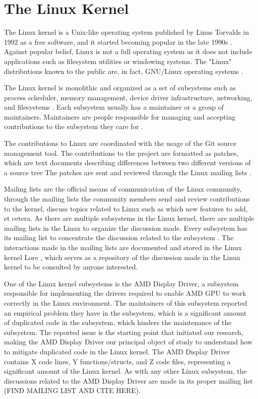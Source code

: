 \en

\section{The Linux Kernel}

The Linux kernel is a Unix-like operating system published by Linus Torvalds in 1992 as a free software, and
it started becoming popular in the late 1990s \citep{linuxbook}. Against popular belief, Linux is not a full 
operating system as it does not include applications such as filesystem utilities or windowing systems. The "Linux" 
distributions known to the public are, in fact, GNU/Linux operating systems \citep{gnuref}.

The Linux kernel is monolithic and organized as a set of subsystems such as process scheduler, memory management, 
device driver infrastructure, networking, and filesystems \citep{melissa}.
Each subsystem usually has a maintainer or a group of maintainers.  Maintainers are people responsible 
for managing and accepting contributions to the subsystem they care for \citep{melissa}.

The contributions to Linux are coordinated with the usage of the Git source management tool.
The contributions to the project are formatted as patches, which are text documents describing differences 
between two different versions of a source tree The patches are sent and reviewed through the 
Linux mailing lists \citep{melissa}.

Mailing lists are the official means of communication of the Linux community, through the mailing lists 
the community members send and review contributions to the kernel, discuss topics related to Linux such as 
which new features to add, et cetera. As there are multiple subsystems in the Linux kernel, there are 
multiple mailing lists in the Linux to organize the discussion made. Every subsystem has its mailing 
list to concentrate the discussion related to the subsystem \citep{melissa}. 
The interactions made in the mailing lists are documented and stored in the Linux kernel Lore
\citep{linuxlore}, which serves as a repository of the discussion made in the Linux kernel to be
consulted by anyone interested.

One of the Linux kernel subsystems is the AMD Display Driver, a subsystem responsible for implementing 
the drivers required to enable AMD GPU to work correctly in the Linux environment. The maintainers of 
this subsystem reported an empirical problem they have in the subsystem, which is a significant amount 
of duplicated code in the subsystem, which hinders the maintenance of the subsystem. The reported issue 
is the starting point that initiated our research, making the AMD Display Driver our principal object 
of study to understand how to mitigate duplicated code in the Linux kernel. The AMD Display Driver 
contains X code lines, Y functions/structs, and Z code files, representing a significant amount of 
the Linux kernel. As with any other Linux subsystem, the discussions related to the AMD Display Driver 
are made in its proper mailing list (FIND MAILING LIST AND CITE HERE).
